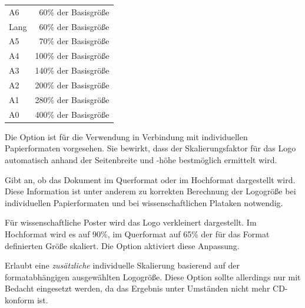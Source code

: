 \begin{tabular}{lr}
  A6  & 60\% der Basisgröße   \\
  Lang& 60\% der Basisgröße   \\
  A5  & 70\% der Basisgröße   \\
  A4  & 100\% der Basisgröße  \\
  A3  & 140\% der Basisgröße  \\
  A2  & 200\% der Basisgröße  \\
  A1  & 280\% der Basisgröße  \\
  A0  & 400\% der Basisgröße   \\
\end{tabular}

\begin{Declaration}
\end{Declaration}
Die Option  ist für die Verwendung in Verbindung mit
individuellen Papierformaten vorgesehen.
Sie bewirkt, dass der Skalierungsfaktor für das Logo automatisch anhand
der Seitenbreite und -höhe bestmöglich ermittelt wird.

\begin{Declaration}
\end{Declaration}
Gibt an, ob das Dokument im Querformat oder im Hochformat dargestellt wird.
Diese Information ist unter anderem zu korrekten Berechnung der Logogröße
bei individuellen Papierformaten und bei wissenschaftlichen Plataken notwendig.

\begin{Declaration}
\end{Declaration}
Für wissenschaftliche Poster wird das Logo verkleinert dargestellt.
Im Hochformat wird es auf 90\%, im Querformat auf 65\% der für das Format
definierten Größe skaliert.
Die Option  aktiviert diese Anpassung.


\begin{Declaration}
\end{Declaration}

Erlaubt eine \emph{zusätzliche} individuelle Skalierung basierend auf
der formatabhängigen ausgewählten Logogröße. Diese Option sollte allerdings
nur mit Bedacht eingesetzt werden, da das Ergebnis unter Umständen nicht mehr
CD-konform ist.

